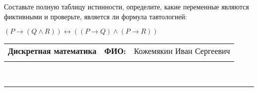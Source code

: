 \documentclass[10pt]{exam}
\newcommand{\class}{Дискретная математика}
\newcommand{\examdate}{}
\begin{document}
\begin{questions}
\begin{enumerate} [a)]
\end{enumerate}\question Составьте полную таблицу истинности, определите, какие переменные являются фиктивными и проверьте, является ли формула тавтологией:

$(P \rightarrow (Q \land R)) \leftrightarrow ((P \rightarrow Q) \land (P \rightarrow R))$

\end{questions}
\newpage
\begin{flushright}
\begin{tabular}{p{2.8in} r l}
\textbf{\class} & \textbf{ФИО:} &Кожемякин Иван Сергеевич
\\

\textbf{\examdate} &&\\
\end{tabular}\\
\end{flushright}
\rule[1ex]{\textwidth}{.1pt}
\end{document}
